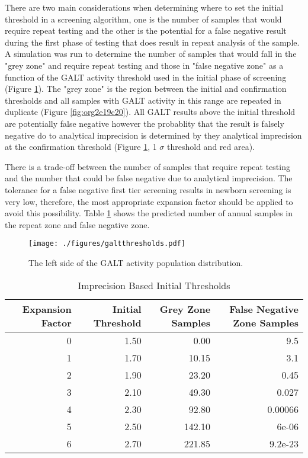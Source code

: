 \documentclass[review]{elsarticle}
\begin{document}
There are two main considerations when determining where to set the
initial threshold in a screening algorithm, one is the number of
samples that would require repeat testing and the other is the
potential for a false negative result during the first phase of
testing that does result in repeat analysis of the sample. A
simulation was run to determine the number of samples that would fall
in the "grey zone" and require repeat testing and those in "false
negative zone" as a function of the GALT activity threshold used in
the initial phase of screening (Figure \ref{fig:org1be3c88}). The "grey
zone" is the region between the initial and confirmation thresholds
and all samples with GALT activity in this range are repeated in
duplicate (Figure \ref{fig:org2e19c20}). All GALT results above the initial
threshold are potentially false negative however the probablity that
the result is falsely negative do to analytical imprecision is
determined by they analytical imprecision at the confirmation
threshold (Figure \ref{fig:org1be3c88}, 1 \(\sigma\) threshold and red area).

There is a trade-off between the number of samples that require repeat
testing and the number that could be false negative due to analytical
imprecision. The tolerance for a false negative first tier screening
results in newborn screening is very low, therefore, the most
appropriate expansion factor should be applied to avoid this
possibility. Table \ref{tab:imprecision} shows the predicted number of
annual samples in the repeat zone and false negative zone.

\begin{figure}[htbp]
\centering
\texttt{[image: ./figures/galtthresholds.pdf]}
\caption{\label{fig:org1be3c88}The left side of the GALT activity population distribution.}
\end{figure}


\begin{table}[ht]
\centering
\begin{tabular}{rrrr}
  \hline
Expansion Factor & Initial Threshold & Grey Zone Samples & False Negative Zone Samples \\ 
  \hline
  0 & 1.50 & 0.00 & 9.5 \\ 
    1 & 1.70 & 10.15 & 3.1 \\ 
    2 & 1.90 & 23.20 & 0.45 \\ 
    3 & 2.10 & 49.30 & 0.027 \\ 
    4 & 2.30 & 92.80 & 0.00066 \\ 
    5 & 2.50 & 142.10 & 6e-06 \\ 
    6 & 2.70 & 221.85 & 9.2e-23 \\ 
   \hline
\end{tabular}
\caption{Imprecision Based Initial Thresholds} 
\label{tab:imprecision}
\end{table}
\end{document}
